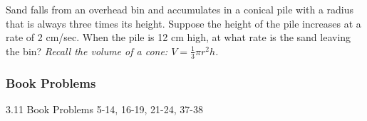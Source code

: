 \documentclass[cal1spr16Lectures.tex]{subfiles}
\begin{document}
\begin{frame}
\begin{exe}
Sand falls from an overhead bin and accumulates in a conical pile with a radius that is always three times its height.  Suppose the height of the pile increases at a rate of 2 cm/sec.  When the pile is 12 cm high, at what rate is the sand leaving the bin?  \emph{Recall the volume of a cone: $V=\textstyle\frac{1}{3}\pi r^2h$.}
\end{exe}
\end{frame}

\subsubsection{Book Problems}

\begin{frame}
\begin{block}{3.11 Book Problems}
5-14, 16-19, 21-24, 37-38
\end{block}
\end{frame}
\end{document}
